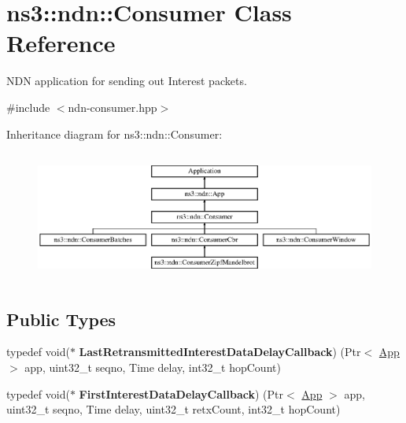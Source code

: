 \hypertarget{classns3_1_1ndn_1_1Consumer}{}\section{ns3\+:\+:ndn\+:\+:Consumer Class Reference}
\label{classns3_1_1ndn_1_1Consumer}


N\+DN application for sending out Interest packets.  




{\ttfamily \#include $<$ndn-\/consumer.\+hpp$>$}

Inheritance diagram for ns3\+:\+:ndn\+:\+:Consumer\+:\begin{figure}[H]
\begin{center}
\leavevmode
\includegraphics[height=4.301075cm]{classns3_1_1ndn_1_1Consumer}
\end{center}
\end{figure}
\subsection*{Public Types}
\begin{DoxyCompactItemize}
\item 
typedef void($\ast$ {\bfseries Last\+Retransmitted\+Interest\+Data\+Delay\+Callback}) (Ptr$<$ \hyperlink{classns3_1_1ndn_1_1App}{App} $>$ app, uint32\+\_\+t seqno, Time delay, int32\+\_\+t hop\+Count)\hypertarget{classns3_1_1ndn_1_1Consumer_a5aaf53d6209bb1028573663dcd21fc82}{}\label{classns3_1_1ndn_1_1Consumer_a5aaf53d6209bb1028573663dcd21fc82}

\item 
typedef void($\ast$ {\bfseries First\+Interest\+Data\+Delay\+Callback}) (Ptr$<$ \hyperlink{classns3_1_1ndn_1_1App}{App} $>$ app, uint32\+\_\+t seqno, Time delay, uint32\+\_\+t retx\+Count, int32\+\_\+t hop\+Count)\hypertarget{classns3_1_1ndn_1_1Consumer_aa897934eaccbc1ed43b7b53011266ba7}{}\label{classns3_1_1ndn_1_1Consumer_aa897934eaccbc1ed43b7b53011266ba7}

\end{DoxyCompactItemize}
